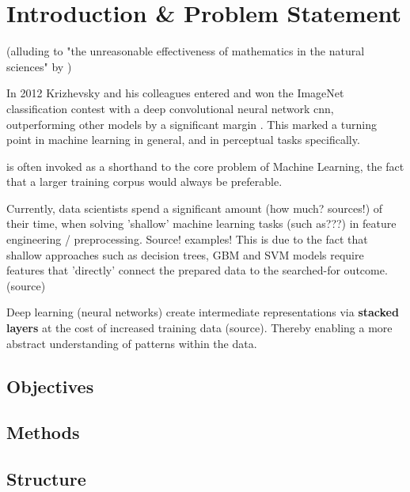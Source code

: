 \chapter{Introduction \& Problem Statement}

(alluding to "the unreasonable effectiveness of mathematics in the natural sciences" by \cite{mathematics_unreasonable})

In 2012 Krizhevsky and his colleagues entered and won the ImageNet classification contest with a deep convolutional neural network \ac{cnn}, outperforming other models by a significant margin \cite{krizhevsky2012imagenet}. This marked a turning point in machine learning in general, and in perceptual tasks specifically. 

\cite{norvig_eod} is often invoked as a shorthand to the core problem of Machine Learning, the fact that a larger training corpus would always be preferable.

Currently, data scientists spend a significant amount (how much? sources!) of their time, when solving 'shallow' machine learning tasks (such as???) in feature engineering / preprocessing. Source! examples!
This is due to the fact that shallow approaches such as decision trees, GBM and SVM models require features that 'directly' connect the prepared data to the searched-for outcome. (source) 

Deep learning (neural networks) create intermediate representations via \textbf{stacked layers} at the cost of increased training data (source). 
Thereby enabling a more abstract understanding of patterns within the data.

\citet{Shearer2000}

\section{Objectives}


\section{Methods}


\section{Structure}

